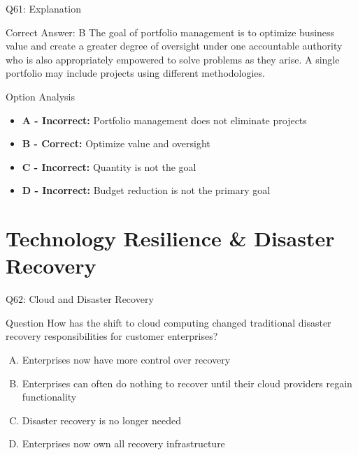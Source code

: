 \documentclass{beamer}
\begin{document}
	\begin{frame}{Q61: Explanation}
		\begin{block}{Correct Answer: B}
			The goal of portfolio management is to optimize business value and create a greater degree of oversight under one accountable authority who is also appropriately empowered to solve problems as they arise. A single portfolio may include projects using different methodologies.
		\end{block}
		\begin{block}{Option Analysis}
			\begin{itemize}
				\item \textbf{A - Incorrect:} Portfolio management does not eliminate projects
				\item \textbf{B - Correct:} Optimize value and oversight
				\item \textbf{C - Incorrect:} Quantity is not the goal
				\item \textbf{D - Incorrect:} Budget reduction is not the primary goal
			\end{itemize}
		\end{block}
	\end{frame}
	
	
	\section{Technology Resilience \& Disaster Recovery}
	
	\begin{frame}{Q62: Cloud and Disaster Recovery}
		\begin{block}{Question}
			How has the shift to cloud computing changed traditional disaster recovery responsibilities for customer enterprises?
		\end{block}
		\begin{enumerate}[(A)]
			\item Enterprises now have more control over recovery
			\item Enterprises can often do nothing to recover until their cloud providers regain functionality
			\item Disaster recovery is no longer needed
			\item Enterprises now own all recovery infrastructure
		\end{enumerate}
	\end{frame}
	
\end{document}
